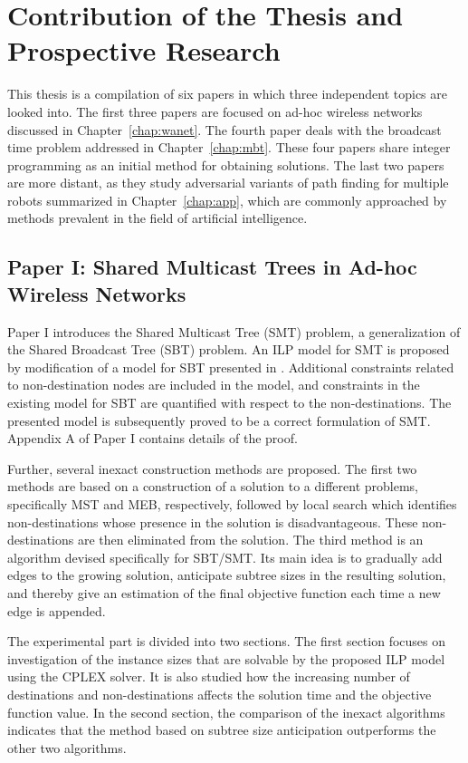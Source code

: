 \chapter{Contribution of the Thesis and Prospective Research}

This thesis is a compilation of six papers in which three independent topics are looked into.
The first three papers are focused on ad-hoc wireless networks discussed in Chapter~\ref{chap:wanet}.
The fourth paper deals with the broadcast time problem addressed in Chapter~\ref{chap:mbt}.
These four papers share integer programming as an initial method for obtaining solutions.
The last two papers are more distant, as they study adversarial variants of path finding for multiple robots summarized in Chapter~\ref{chap:app}, 
which are commonly approached by methods prevalent in the field of artificial intelligence.
%
%
\section{Paper I:  Shared Multicast Trees in Ad-hoc Wireless Networks}

Paper I introduces the Shared Multicast Tree (SMT) problem, a generalization of the Shared Broadcast Tree (SBT) problem.
An ILP model for SMT is proposed by modification of a model for SBT presented in \cite{yuan12}.
Additional constraints related to non-destination nodes are included in the model, and constraints in the existing model for SBT are quantified with respect to the non-destinations.
The presented model is subsequently proved to be a correct formulation of SMT.
Appendix A of Paper I contains details of the proof.

Further, several inexact construction methods are proposed.
The first two methods are based on a construction of a solution to a different problems, specifically MST and MEB, respectively, 
followed by local search which identifies non-destinations whose presence in the solution is disadvantageous.
These non-destinations are then eliminated from the solution.
The third method is an algorithm devised specifically for SBT/SMT.
Its main idea is to gradually add edges to the growing solution, anticipate subtree sizes in the resulting solution, 
and thereby give an estimation of the final objective function each time a new edge is appended. 

The experimental part is divided into two sections.
The first section focuses on investigation of the instance sizes that are solvable by the proposed ILP model using the CPLEX solver.
It is also studied how the increasing number of destinations and non-destinations affects the solution time and the objective function value.
In the second section, the comparison of the inexact algorithms indicates that the method based on subtree size anticipation outperforms the other two algorithms.

